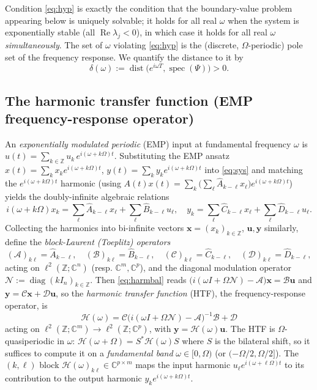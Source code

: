 \documentclass{amsart}
\theoremstyle{definition}
\DeclareMathOperator{\spec}{spec}
\DeclareMathOperator{\diag}{diag}
\DeclareMathOperator{\dist}{dist}
\newcommand{\C}{\mathbb{C}}
\newcommand{\Z}{\mathbb{Z}}
\newcommand{\Acal}{\mathcal{A}}
\newcommand{\Bcal}{\mathcal{B}}
\newcommand{\Ccal}{\mathcal{C}}
\newcommand{\Dcal}{\mathcal{D}}
\newcommand{\Hcal}{\mathcal{H}}
\newcommand{\Ncal}{\mathcal{N}}
\begin{document}
Condition \eqref{eq:hyp} is exactly the condition that the boundary-value
problem appearing below is uniquely solvable; it holds for all real $\omega$
when the system is exponentially stable (all $\operatorname{Re}\lambda_j<0$), in
which case it holds for all real $\omega$ \emph{simultaneously}. The set of
$\omega$ violating \eqref{eq:hyp} is the (discrete, $\Omega$-periodic) pole set
of the frequency response. We quantify the distance to it by
\begin{equation}\label{eq:gap}
\delta(\omega):=\dist\!\big(e^{i\omega T},\spec(\Psi)\big)>0 .
\end{equation}

\subsection{The harmonic transfer function (EMP frequency-response operator)}
\label{sec:HTF}
An \emph{exponentially modulated periodic} (EMP) input at fundamental frequency
$\omega$ is $u(t)=\sum_{k\in\Z}u_k\,e^{i(\omega+k\Omega)t}$. Substituting the
EMP ansatz $x(t)=\sum_k x_k e^{i(\omega+k\Omega)t}$,
$y(t)=\sum_k y_k e^{i(\omega+k\Omega)t}$ into \eqref{eq:sys} and matching the
$e^{i(\omega+k\Omega)t}$ harmonic (using
$A(t)x(t)=\sum_k\big(\sum_\ell\hat A_{k-\ell}x_\ell\big)e^{i(\omega+k\Omega)t}$)
yields the doubly-infinite algebraic relations
\begin{equation}\label{eq:harmbal}
i(\omega+k\Omega)x_k=\sum_{\ell}\hat A_{k-\ell}x_\ell+\sum_\ell\hat B_{k-\ell}u_\ell,
\quad
y_k=\sum_\ell\hat C_{k-\ell}x_\ell+\sum_\ell\hat D_{k-\ell}u_\ell .
\end{equation}
Collecting the harmonics into bi-infinite vectors
$\mathbf{x}=(x_k)_{k\in\Z}$, $\mathbf u,\mathbf y$ similarly, define the
\emph{block-Laurent (Toeplitz) operators}
\begin{equation}\label{eq:Toep}
(\Acal)_{k\ell}=\hat A_{k-\ell},\quad
(\Bcal)_{k\ell}=\hat B_{k-\ell},\quad
(\Ccal)_{k\ell}=\hat C_{k-\ell},\quad
(\Dcal)_{k\ell}=\hat D_{k-\ell},
\end{equation}
acting on $\ell^2(\Z;\C^n)$ (resp. $\C^m,\C^p$), and the diagonal modulation
operator $\Ncal:=\diag(k I_n)_{k\in\Z}$. Then \eqref{eq:harmbal} reads
$\big(i(\omega I+\Omega\Ncal)-\Acal\big)\mathbf x=\Bcal\mathbf u$ and
$\mathbf y=\Ccal\mathbf x+\Dcal\mathbf u$, so the \emph{harmonic transfer
function} (HTF), the frequency-response operator, is
\begin{equation}\label{eq:HTFdef}
\boxed{\;\Hcal(\omega)=\Ccal\big(i(\omega I+\Omega\Ncal)-\Acal\big)^{-1}\Bcal+\Dcal\;}
\end{equation}
acting on $\ell^2(\Z;\C^m)\to\ell^2(\Z;\C^p)$, with $\mathbf y=\Hcal(\omega)\mathbf u$.
The HTF is $\Omega$-quasiperiodic in $\omega$:
$\Hcal(\omega+\Omega)=S^*\Hcal(\omega)S$ where $S$ is the bilateral shift, so it
suffices to compute it on a \emph{fundamental band} $\omega\in[0,\Omega)$ (or
$(-\Omega/2,\Omega/2]$). The $(k,\ell)$ block $\Hcal(\omega)_{k\ell}\in\C^{p\times m}$
maps the input harmonic $u_\ell e^{i(\omega+\ell\Omega)t}$ to its contribution
to the output harmonic $y_k e^{i(\omega+k\Omega)t}$.
\end{document}
